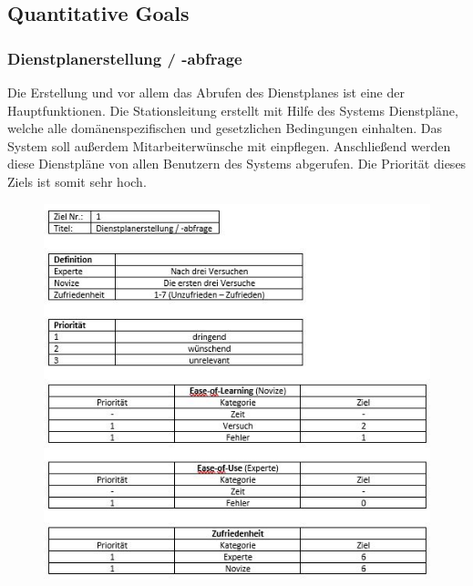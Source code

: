 \documentclass[11pt,
paper=a4,
bibtotocnumbered,	  %
liststotocnumbered,  %
DIV=calc,		  %
tablecaptionabove,	  %
headinclude,
]{article}
\begin{document}
\subsection{Quantitative Goals}
\subsubsection{Dienstplanerstellung / -abfrage}
Die Erstellung und vor allem das Abrufen des Dienstplanes ist eine der Hauptfunktionen. Die Stationsleitung erstellt mit Hilfe des Systems Dienstpläne, welche alle domänenspezifischen und gesetzlichen Bedingungen einhalten. Das System soll außerdem Mitarbeiterwünsche mit einpflegen. Anschließend werden diese Dienstpläne von allen Benutzern des Systems abgerufen. Die Priorität dieses Ziels ist somit sehr hoch.
\begin{figure}
\includegraphics[scale=1]{Bilder/dienstplanAbfrage.jpg}
\end{figure}
\end{document}
